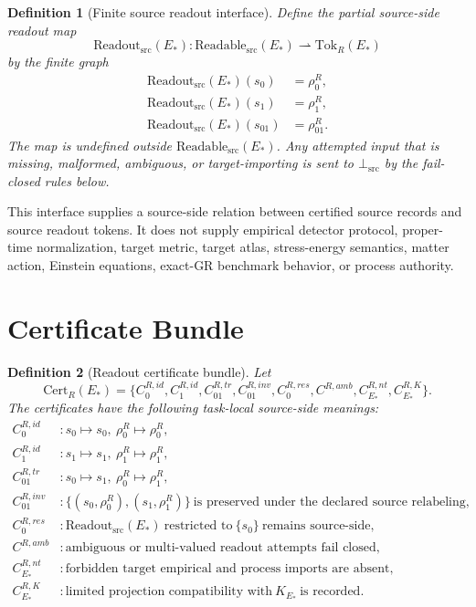 \documentclass[11pt]{article}
\newcommand{\EStar}{E_{\ast}}
\newcommand{\ReadableSrc}{\mathrm{Readable}_{\mathrm{src}}}
\newcommand{\ReadoutSrc}{\mathrm{Readout}_{\mathrm{src}}}
\newcommand{\TokR}{\mathrm{Tok}_{R}}
\newcommand{\CertR}{\mathrm{Cert}_{R}}
\newcommand{\BottomSrc}{\bot_{\mathrm{src}}}
\newcommand{\KStar}{K_{E_{\ast}}}
\newtheorem{definition}{Definition}
\begin{document}
\begin{definition}[Finite source readout interface]
Define the partial source-side readout map
\[
  \ReadoutSrc(\EStar):\ReadableSrc(\EStar)\rightharpoonup \TokR(\EStar)
\]
by the finite graph
\[
\begin{aligned}
  \ReadoutSrc(\EStar)(s_0) &= \rho^R_0,\\
  \ReadoutSrc(\EStar)(s_1) &= \rho^R_1,\\
  \ReadoutSrc(\EStar)(s_{01}) &= \rho^R_{01}.
\end{aligned}
\]
The map is undefined outside \(\ReadableSrc(\EStar)\). Any attempted input
that is missing, malformed, ambiguous, or target-importing is sent to
\(\BottomSrc\) by the fail-closed rules below.
\end{definition}

This interface supplies a source-side relation between certified source
records and source readout tokens. It does not supply empirical detector
protocol, proper-time normalization, target metric, target atlas,
stress-energy semantics, matter action, Einstein equations, exact-GR
benchmark behavior, or process authority.

\section{Certificate Bundle}

\begin{definition}[Readout certificate bundle]
Let
\[
\CertR(\EStar)=
\{C^{R,id}_0,C^{R,id}_1,C^{R,tr}_{01},C^{R,inv}_{01},
  C^{R,res}_0,C^{R,amb},C^{R,nt}_{\EStar},C^{R,K}_{\EStar}\}.
\]
The certificates have the following task-local source-side meanings:
\[
\begin{array}{ll}
C^{R,id}_0 &: s_0\mapsto s_0,\ \rho^R_0\mapsto \rho^R_0,\\
C^{R,id}_1 &: s_1\mapsto s_1,\ \rho^R_1\mapsto \rho^R_1,\\
C^{R,tr}_{01} &: s_0\mapsto s_1,\ \rho^R_0\mapsto \rho^R_1,\\
C^{R,inv}_{01} &: \{(s_0,\rho^R_0),(s_1,\rho^R_1)\}\ \text{is preserved under the declared source relabeling},\\
C^{R,res}_0 &: \ReadoutSrc(\EStar)\ \text{restricted to}\ \{s_0\}\ \text{remains source-side},\\
C^{R,amb} &: \text{ambiguous or multi-valued readout attempts fail closed},\\
C^{R,nt}_{\EStar} &: \text{forbidden target empirical and process imports are absent},\\
C^{R,K}_{\EStar} &: \text{limited projection compatibility with}\ \KStar\ \text{is recorded}.
\end{array}
\]
\end{definition}
\end{document}
